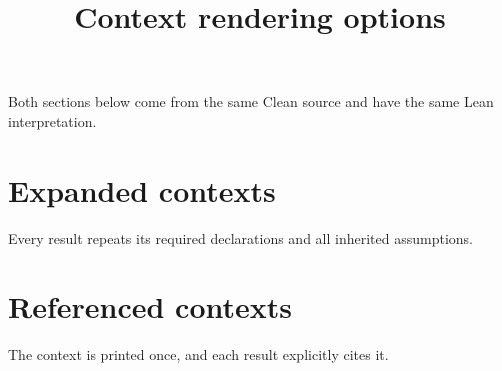 \documentclass[11pt]{article}
\title{Context rendering options}
\author{}
\date{}
\begin{document}
\par\medskip
\maketitle
Both sections below come from the same Clean source and have the same Lean interpretation.
\section{Expanded contexts}
Every result repeats its required declarations and all inherited assumptions.
\clearpage
\section{Referenced contexts}
The context is printed once, and each result explicitly cites it.
\end{document}
